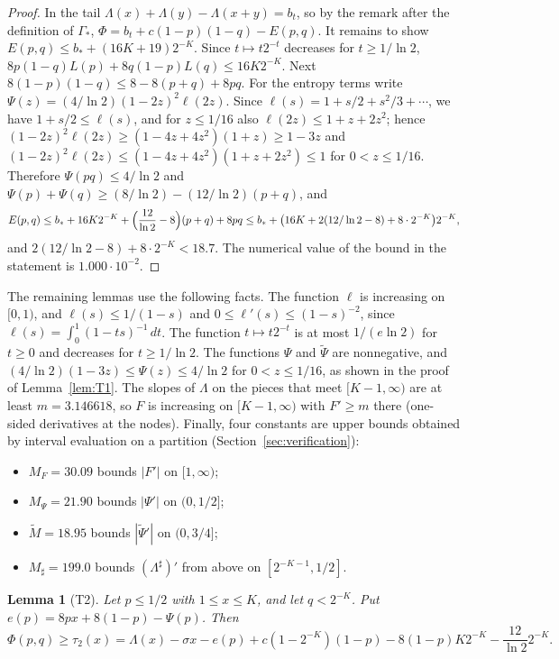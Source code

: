 \documentclass[11pt]{amsart}
\newtheorem{lemma}[theorem]{Lemma}
\theoremstyle{remark}
\begin{document}
\begin{proof}
In the tail $\Lambda(x)+\Lambda(y)-\Lambda(x+y)=b_t$, so by the remark after the definition of $\Gamma_*$, $\Phi=b_t+c(1-p)(1-q)-E(p,q)$. It remains to show $E(p,q)\le b_*+(16K+19)2^{-K}$. Since $t\mapsto t2^{-t}$ decreases for $t\ge1/\ln2$, $8p(1-q)L(p)+8q(1-p)L(q)\le16K2^{-K}$. Next $8(1-p)(1-q)\le8-8(p+q)+8pq$. For the entropy terms write $\Psi(z)=(4/\ln2)(1-2z)^2\ell(2z)$. Since $\ell(s)=1+s/2+s^2/3+\cdots$, we have $1+s/2\le\ell(s)$, and for $z\le1/16$ also $\ell(2z)\le1+z+2z^2$; hence $(1-2z)^2\ell(2z)\ge(1-4z+4z^2)(1+z)\ge1-3z$ and $(1-2z)^2\ell(2z)\le(1-4z+4z^2)(1+z+2z^2)\le1$ for $0<z\le1/16$. Therefore $\Psi(pq)\le4/\ln2$ and $\Psi(p)+\Psi(q)\ge(8/\ln2)-(12/\ln2)(p+q)$, and
\[
E(p,q)\le b_*+16K2^{-K}+\Bigl(\frac{12}{\ln2}-8\Bigr)(p+q)+8pq\le b_*+\bigl(16K+2(12/\ln2-8)+8\cdot2^{-K}\bigr)2^{-K},
\]
and $2(12/\ln2-8)+8\cdot2^{-K}<18.7$. The numerical value of the bound in the statement is $1.000\cdot10^{-2}$.
\end{proof}

The remaining lemmas use the following facts. The function $\ell$ is increasing on $[0,1)$, and $\ell(s)\le1/(1-s)$ and $0\le\ell'(s)\le(1-s)^{-2}$, since $\ell(s)=\int_0^1(1-ts)^{-1}\,dt$. The function $t\mapsto t2^{-t}$ is at most $1/(e\ln2)$ for $t\ge0$ and decreases for $t\ge1/\ln2$. The functions $\Psi$ and $\widetilde\Psi$ are nonnegative, and $(4/\ln2)(1-3z)\le\Psi(z)\le4/\ln2$ for $0<z\le1/16$, as shown in the proof of Lemma~\ref{lem:T1}. The slopes of $\Lambda$ on the pieces that meet $[K-1,\infty)$ are at least $m=3.146618$, so $F$ is increasing on $[K-1,\infty)$ with $F'\ge m$ there (one-sided derivatives at the nodes). Finally, four constants are upper bounds obtained by interval evaluation on a partition (Section~\ref{sec:verification}):
\begin{itemize}
\item $M_F=30.09$ bounds $|F'|$ on $[1,\infty)$;
\item $M_\Psi=21.90$ bounds $|\Psi'|$ on $(0,1/2]$;
\item $\widetilde M=18.95$ bounds $|\widetilde\Psi'|$ on $(0,3/4]$;
\item $M_\sharp=199.0$ bounds $(\Lambda^\sharp)'$ from above on $[2^{-K-1},1/2]$.
\end{itemize}

\begin{lemma}[T2]\label{lem:T2}
Let $p\le1/2$ with $1\le x\le K$, and let $q<2^{-K}$. Put $e(p)=8px+8(1-p)-\Psi(p)$. Then
\[
\Phi(p,q)\ge\tau_2(x)=\Lambda(x)-\sigma x-e(p)+c(1-2^{-K})(1-p)-8(1-p)K2^{-K}-\frac{12}{\ln2}2^{-K}.
\]
\end{lemma}
\end{document}
